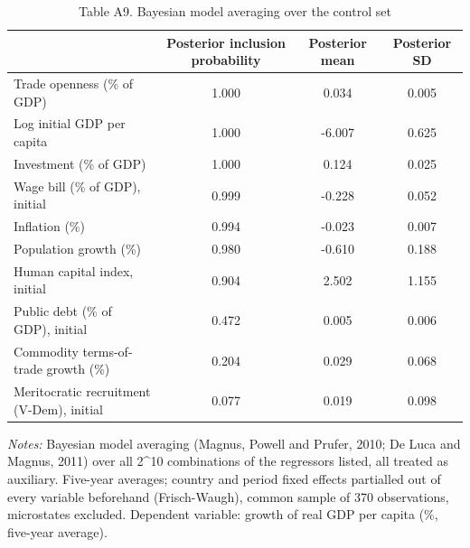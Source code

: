 \begin{table}[htbp]\centering\footnotesize
\providecommand{\sym}[1]{\ensuremath{^{#1}}}
\caption{Table A9. Bayesian model averaging over the control set}\label{tab:TableA9_bma}
\begin{tabular}{l*{3}{c}}
\toprule
 & Posterior inclusion probability & Posterior mean & Posterior SD \\
\midrule
Trade openness (\% of GDP) & 1.000 & 0.034 & 0.005 \\
Log initial GDP per capita & 1.000 & -6.007 & 0.625 \\
Investment (\% of GDP) & 1.000 & 0.124 & 0.025 \\
Wage bill (\% of GDP), initial & 0.999 & -0.228 & 0.052 \\
Inflation (\%) & 0.994 & -0.023 & 0.007 \\
Population growth (\%) & 0.980 & -0.610 & 0.188 \\
Human capital index, initial & 0.904 & 2.502 & 1.155 \\
Public debt (\% of GDP), initial & 0.472 & 0.005 & 0.006 \\
Commodity terms-of-trade growth (\%) & 0.204 & 0.029 & 0.068 \\
Meritocratic recruitment (V-Dem), initial & 0.077 & 0.019 & 0.098 \\
\bottomrule
\end{tabular}
\begin{minipage}{0.95\linewidth}\vspace{4pt}\scriptsize \textit{Notes:} Bayesian model averaging (Magnus, Powell and Prufer, 2010; De Luca and Magnus, 2011) over all 2^10 combinations of the regressors listed, all treated as auxiliary. Five-year averages; country and period fixed effects partialled out of every variable beforehand (Frisch-Waugh), common sample of 370 observations, microstates excluded. Dependent variable: growth of real GDP per capita (\%, five-year average).\end{minipage}
\end{table}
